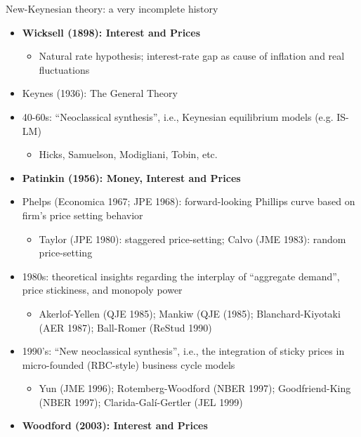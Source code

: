 \documentclass[9pt,xcolor={dvipsnames}]{beamer}
\newcommand{\bit}{\begin{itemize}}
\newcommand{\eit}{\end{itemize}}
\begin{document}
\begin{frame}{New-Keynesian theory: a very incomplete history}

\bit
\setlength\itemsep{1em} 

\item \bf Wicksell (1898): Interest and Prices\normalfont 
\bit
	\item Natural rate hypothesis; interest-rate gap as cause of inflation and real fluctuations
\eit

\item Keynes (1936): The General Theory

\item 40-60s: ``Neoclassical synthesis'', i.e., Keynesian equilibrium models (e.g. IS-LM) 
\bit
	\item Hicks, Samuelson, Modigliani, Tobin, etc.
\eit

\item \bf Patinkin (1956): Money, Interest and Prices \normalfont

\item Phelps (Economica 1967; JPE 1968): forward-looking Phillips curve based on firm's price setting behavior
\bit
	\item Taylor (JPE 1980): staggered price-setting; Calvo (JME 1983): random price-setting
\eit

\item 1980s: theoretical insights regarding the interplay of ``aggregate demand'', price stickiness, and monopoly power
\bit
\setlength\itemsep{0.5em} 
\item Akerlof-Yellen (QJE 1985); Mankiw (QJE (1985); Blanchard-Kiyotaki (AER 1987); Ball-Romer (ReStud 1990)
\eit

\item 1990's: ``New neoclassical synthesis'', i.e., the integration of sticky prices in micro-founded (RBC-style) business cycle models
\bit
\setlength\itemsep{0.5em} 
\item Yun (JME 1996); Rotemberg-Woodford (NBER 1997); Goodfriend-King (NBER 1997); Clarida-Gal\'{i}-Gertler (JEL 1999)
\eit

\item \bf Woodford (2003): Interest and Prices \normalfont

%

\eit

\end{frame}
\end{document}
